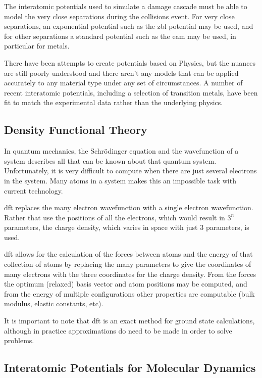 The interatomic potentials used to simulate a damage cascade must be able to model the very close separations during the collisions event.  For very close separations, an exponential potential such as the \acrfull{zbl} potential may be used, and for other separations a standard potential such as the \acrfull{eam} may be used, in particular for metals.

There have been attempts to create potentials based on Physics, but the nuances are still poorly understood and there aren't any models that can be applied accurately to any material type under any set of circumstances.  A number of recent interatomic potentials, including a selection of transition metals, have been fit to match the experimental data rather than the underlying physics.


\FloatBarrier
\subsection{Density Functional Theory}

In quantum mechanics, the Schr\"{o}dinger equation and the wavefunction of a system describes all that can be known about that quantum system.  Unfortunately, it is very difficult to compute when there are just several electrons in the system.  Many atoms in a system makes this an impossible task with current technology.

\acrfull{dft} replaces the many electron wavefunction with a single electron wavefunction.  Rather that use the positions of all the electrons, which would result in $3^n$ parameters, the charge density, which varies in space with just 3 parameters, is used.

\acrshort{dft} allows for the calculation of the forces between atoms and the energy of that collection of atoms by replacing the many parameters to give the coordinates of many electrons with the three coordinates for the charge density.  From the forces the optimum (relaxed) basis vector and atom positions may be computed, and from the energy of multiple configurations other properties are computable (bulk modulus, elastic constants, etc).

It is important to note that \acrshort{dft} is an exact method for ground state calculations, although in practice approximations do need to be made in order to solve problems.


\subsection{Interatomic Potentials for Molecular Dynamics}

